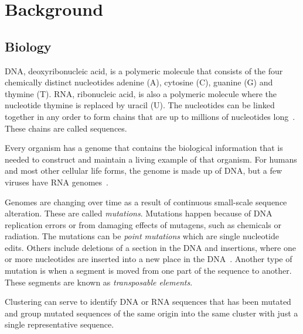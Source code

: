 \section{Background}

\subsection{Biology}
\label{sec:biology}

DNA, deoxyribonucleic acid, is a polymeric molecule that consists of the four
chemically distinct nucleotides adenine (A), cytosine (C), guanine (G) and
thymine (T). RNA, ribonucleic acid, is also a polymeric molecule where the
nucleotide thymine is replaced by uracil (U).  The nucleotides can be linked
together in any order to form chains that are up to millions of nucleotides
long~\cite[pp.~8-9]{brown}. These chains are called sequences.

Every organism has a genome that contains the biological information that is
needed to construct and maintain a living example of that organism. For humans
and most other cellular life forms, the genome is made up of DNA, but a few
viruses have RNA genomes~\cite[pp. 3-4]{brown}.

Genomes are changing over time as a result of continuous small-scale sequence
alteration. These are called \textit{mutations}. Mutations happen because of
DNA replication errors or from damaging effects of mutagens, such as chemicals
or radiation. The mutations can be \textit{point mutations} which are single
nucleotide edits. Others include deletions of a section in the DNA and
insertions, where one or more nucleotides are inserted into a new place in the
DNA~\cite[pp. 505-506]{brown}. Another type of mutation is when a segment is moved from one part of the sequence to another. These segments are known as \emph{transposable elements}.

Clustering can serve to identify DNA or RNA sequences that has been mutated and
group mutated sequences of the same origin into the same cluster with just a
single representative sequence.

